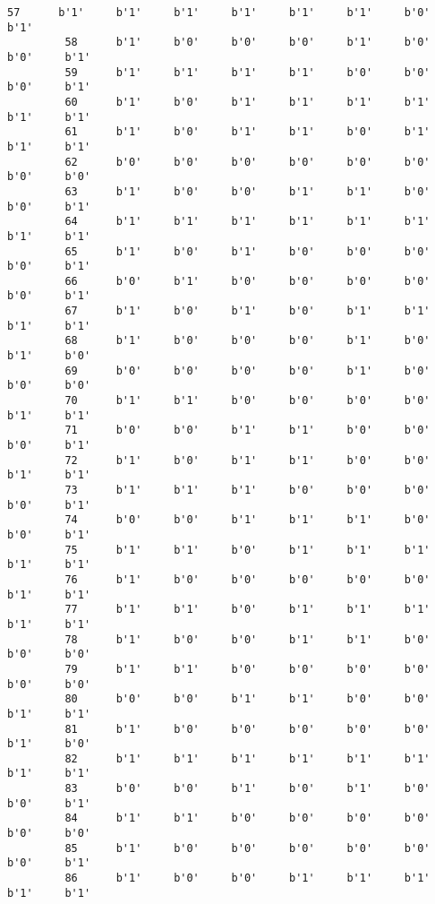 \documentclass[11pt]{article}
\begin{document}
\begin{Verbatim}[commandchars=\\\{\}]
         57      b'1'     b'1'     b'1'     b'1'     b'1'     b'1'     b'0'     b'1'   
         58      b'1'     b'0'     b'0'     b'0'     b'1'     b'0'     b'0'     b'1'   
         59      b'1'     b'1'     b'1'     b'1'     b'0'     b'0'     b'0'     b'1'   
         60      b'1'     b'0'     b'1'     b'1'     b'1'     b'1'     b'1'     b'1'   
         61      b'1'     b'0'     b'1'     b'1'     b'0'     b'1'     b'1'     b'1'   
         62      b'0'     b'0'     b'0'     b'0'     b'0'     b'0'     b'0'     b'0'   
         63      b'1'     b'0'     b'0'     b'1'     b'1'     b'0'     b'0'     b'1'   
         64      b'1'     b'1'     b'1'     b'1'     b'1'     b'1'     b'1'     b'1'   
         65      b'1'     b'0'     b'1'     b'0'     b'0'     b'0'     b'0'     b'1'   
         66      b'0'     b'1'     b'0'     b'0'     b'0'     b'0'     b'0'     b'1'   
         67      b'1'     b'0'     b'1'     b'0'     b'1'     b'1'     b'1'     b'1'   
         68      b'1'     b'0'     b'0'     b'0'     b'1'     b'0'     b'1'     b'0'   
         69      b'0'     b'0'     b'0'     b'0'     b'1'     b'0'     b'0'     b'0'   
         70      b'1'     b'1'     b'0'     b'0'     b'0'     b'0'     b'1'     b'1'   
         71      b'0'     b'0'     b'1'     b'1'     b'0'     b'0'     b'0'     b'1'   
         72      b'1'     b'0'     b'1'     b'1'     b'0'     b'0'     b'1'     b'1'   
         73      b'1'     b'1'     b'1'     b'0'     b'0'     b'0'     b'0'     b'1'   
         74      b'0'     b'0'     b'1'     b'1'     b'1'     b'0'     b'0'     b'1'   
         75      b'1'     b'1'     b'0'     b'1'     b'1'     b'1'     b'1'     b'1'   
         76      b'1'     b'0'     b'0'     b'0'     b'0'     b'0'     b'1'     b'1'   
         77      b'1'     b'1'     b'0'     b'1'     b'1'     b'1'     b'1'     b'1'   
         78      b'1'     b'0'     b'0'     b'1'     b'1'     b'0'     b'0'     b'0'   
         79      b'1'     b'1'     b'0'     b'0'     b'0'     b'0'     b'0'     b'0'   
         80      b'0'     b'0'     b'1'     b'1'     b'0'     b'0'     b'1'     b'1'   
         81      b'1'     b'0'     b'0'     b'0'     b'0'     b'0'     b'1'     b'0'   
         82      b'1'     b'1'     b'1'     b'1'     b'1'     b'1'     b'1'     b'1'   
         83      b'0'     b'0'     b'1'     b'0'     b'1'     b'0'     b'0'     b'1'   
         84      b'1'     b'1'     b'0'     b'0'     b'0'     b'0'     b'0'     b'0'   
         85      b'1'     b'0'     b'0'     b'0'     b'0'     b'0'     b'0'     b'1'   
         86      b'1'     b'0'     b'0'     b'1'     b'1'     b'1'     b'1'     b'1'   

\end{Verbatim}
\end{document}
